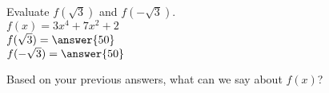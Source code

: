 \documentclass{ximera}
\author{David Kish}
\begin{document}
\begin{exercise}
Evaluate $f(\sqrt{3})$ and $f(-\sqrt{3})$.\\
$f(x)= 3x^4+7x^2+ 2$\\
$f(\sqrt{3})=\answer{50}$\\
$f(-\sqrt{3})=\answer{50}$
\end{exercise}
\begin{exercise}
Based on your previous answers, what can we say about $f(x)$?
\begin{multipleChoice}
\end{multipleChoice}
\end{exercise}
\end{document}
